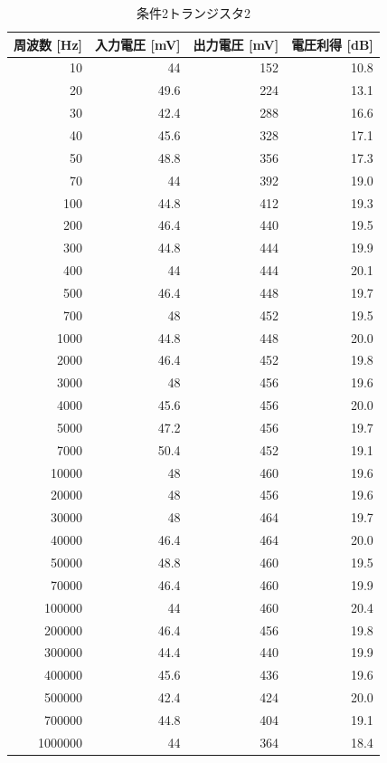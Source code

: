 \documentclass[a4paper,11pt,xelatex,ja=standard]{bxjsarticle}
\begin{document}
        \begin{table}[H]
            \centering
            \caption{条件2トランジスタ2}
            \begin{tabular}{rrrr}
                \hline
                周波数 [Hz] & 入力電圧 [mV] & 出力電圧 [mV] & 電圧利得 [dB] \\
                \hline\hline
                10 & 44 & 152 & 10.8 \\
                20 & 49.6 & 224 & 13.1 \\
                30 & 42.4 & 288 & 16.6 \\
                40 & 45.6 & 328 & 17.1 \\
                50 & 48.8 & 356 & 17.3 \\
                70 & 44 & 392 & 19.0 \\
                100 & 44.8 & 412 & 19.3 \\
                200 & 46.4 & 440 & 19.5 \\
                300 & 44.8 & 444 & 19.9 \\
                400 & 44 & 444 & 20.1 \\
                500 & 46.4 & 448 & 19.7 \\
                700 & 48 & 452 & 19.5 \\
                1000 & 44.8 & 448 & 20.0 \\
                2000 & 46.4 & 452 & 19.8 \\
                3000 & 48 & 456 & 19.6 \\
                4000 & 45.6 & 456 & 20.0 \\
                5000 & 47.2 & 456 & 19.7 \\
                7000 & 50.4 & 452 & 19.1 \\
                10000 & 48 & 460 & 19.6 \\
                20000 & 48 & 456 & 19.6 \\
                30000 & 48 & 464 & 19.7 \\
                40000 & 46.4 & 464 & 20.0 \\
                50000 & 48.8 & 460 & 19.5 \\
                70000 & 46.4 & 460 & 19.9 \\
                100000 & 44 & 460 & 20.4 \\
                200000 & 46.4 & 456 & 19.8 \\
                300000 & 44.4 & 440 & 19.9 \\
                400000 & 45.6 & 436 & 19.6 \\
                500000 & 42.4 & 424 & 20.0 \\
                700000 & 44.8 & 404 & 19.1 \\
                1000000 & 44 & 364 & 18.4 \\
                \hline
            \end{tabular}
        \end{table}
\end{document}
